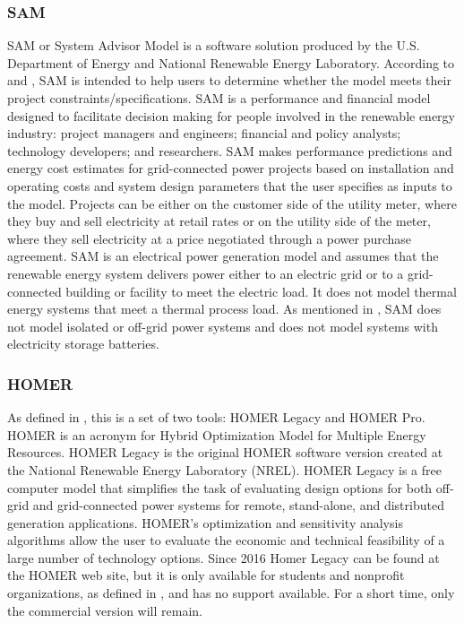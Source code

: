\subsubsection{SAM}

SAM or System Advisor Model is a software solution produced by the U.S. Department of Energy and National Renewable Energy Laboratory. According to \cite{NRELBlair} and \cite{Cameron2008}, SAM is intended to help users to determine whether the model meets their project constraints/specifications. SAM is a performance and financial model designed to facilitate decision making for people involved in the renewable energy industry: project managers and engineers; financial and policy analysts; technology developers; and researchers. SAM makes performance predictions and energy cost estimates for grid-connected power projects based on installation and operating costs and system design parameters that the user specifies as inputs to the model. Projects can be either on the customer side of the utility meter, where they buy and sell electricity at retail rates or on the utility side of the meter, where they sell electricity at a price negotiated through a power purchase agreement. SAM is an electrical power generation model and assumes that the renewable energy system delivers power either to an electric grid or to a grid-connected building or facility to meet the electric load. It does not model thermal energy systems that meet a thermal process load. As mentioned in \cite{NRELBlair}, SAM does not model isolated or off-grid power systems and does not model systems with electricity storage batteries.

\subsubsection{HOMER}

As defined in \cite{HOMER}, this is a set of two tools: HOMER Legacy and HOMER Pro. HOMER is an acronym for Hybrid Optimization Model for Multiple Energy Resources. HOMER Legacy is the original HOMER software version created at the National Renewable Energy Laboratory (NREL). HOMER Legacy is a free computer model that simplifies the task of evaluating design options for both off-grid and grid-connected power systems for remote, stand-alone, and distributed generation applications. HOMER's optimization and sensitivity analysis algorithms allow the user to evaluate the economic and technical feasibility of a large number of technology options. Since 2016 Homer Legacy can be found at the HOMER web site, but it is only available for students and nonprofit organizations, as defined in \cite{HOMER}, and has no support available. For a short time, only the commercial version will remain.
 
